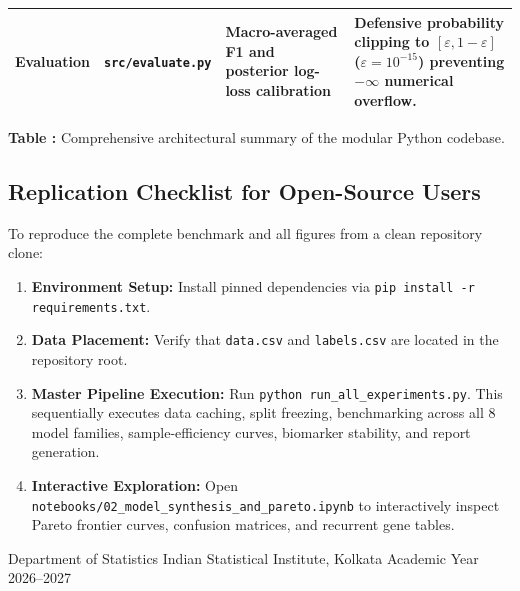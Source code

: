 \documentclass[10pt,a4paper]{article}
\begin{document}
\begin{minipage}{\linewidth}
\begin{tabular}{p{2.4cm} p{3.2cm} p{5.0cm} p{4.8cm}}
Evaluation & \texttt{src/evaluate.py} & Macro-averaged F1 and posterior log-loss calibration & Defensive probability clipping to $[\varepsilon, 1-\varepsilon]$ ($\varepsilon = 10^{-15}$) preventing $-\infty$ numerical overflow. \\
\bottomrule
\end{tabular}
\par\vspace{0.12cm}
\label{tab:code_summary}
{\footnotesize \textbf{Table \thetable:} Comprehensive architectural summary of the modular Python codebase.}
\end{minipage}

\vspace{0.25cm}
\subsection{Replication Checklist for Open-Source Users}
To reproduce the complete benchmark and all figures from a clean repository clone:
\begin{enumerate}
    \item \textbf{Environment Setup:} Install pinned dependencies via \texttt{pip install -r requirements.txt}.
    \item \textbf{Data Placement:} Verify that \texttt{data.csv} and \texttt{labels.csv} are located in the repository root.
    \item \textbf{Master Pipeline Execution:} Run \texttt{python run\_all\_experiments.py}. This sequentially executes data caching, split freezing, benchmarking across all 8 model families, sample-efficiency curves, biomarker stability, and report generation.
    \item \textbf{Interactive Exploration:} Open \texttt{notebooks/02\_model\_synthesis\_and\_pareto.ipynb} to interactively inspect Pareto frontier curves, confusion matrices, and recurrent gene tables.
\end{enumerate}

\vspace{0.4cm}
\vspace{0.2cm}
\begin{center}
  \footnotesize\textcolor{mutedgrey}{Department of Statistics \quad\textbar\quad Indian Statistical Institute, Kolkata \quad\textbar\quad Academic Year 2026--2027}
\end{center}
\end{document}
